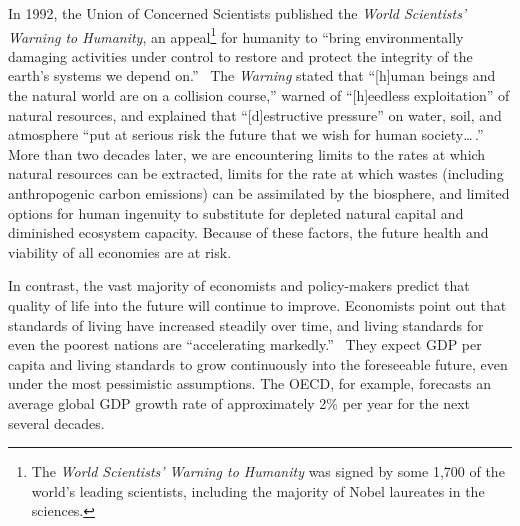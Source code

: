


In 1992, the Union of Concerned Scientists 
published the
\emph{World Scientists' Warning to Humanity},
an appeal\footnote{The \emph{World Scientists' Warning to Humanity} 
	was signed by some 1,700 of the world's leading scientists, 
	including the majority of Nobel laureates in the sciences. 
	} 
for humanity to 
``bring environmentally damaging activities under control 
to restore and protect the integrity of the earth's systems 
we depend on.''~\cite{UCS1992}
The \emph{Warning} stated that 
``[h]uman beings and the natural world are on a collision course,''
warned of ``[h]eedless exploitation'' of natural resources, 
and explained that ``[d]estructive pressure'' on water, soil, and atmosphere
``put at serious risk the future that we wish 
for human society\dots{}\,.''
More than two decades later, we are encountering 
limits to the rates at which natural resources can be extracted, 
limits for the rate at which wastes (including anthropogenic carbon emissions) 
can be assimilated by the biosphere, and
limited options for human ingenuity to substitute 
for depleted natural capital and diminished ecosystem capacity. 
Because of these factors, 
the future health and viability of all economies are at risk.\cite{IPCC2013} 

In contrast, the vast majority of economists and policy-makers predict 
that quality of life into the future will continue to improve. 
Economists point out that standards of living have increased steadily over time,
and living standards for even the poorest nations 
are ``accelerating markedly.''~\cite{Malik:2013aa} 
They expect GDP per capita and living standards to
grow continuously into the foreseeable future,
even under the most pessimistic assumptions.\cite[p.~170]{Malik:2013aa} 
The OECD, for example, forecasts an average global GDP
growth rate of approximately 2\% per year 
for the next several decades.\cite[Table A.1]{OECD2012}

